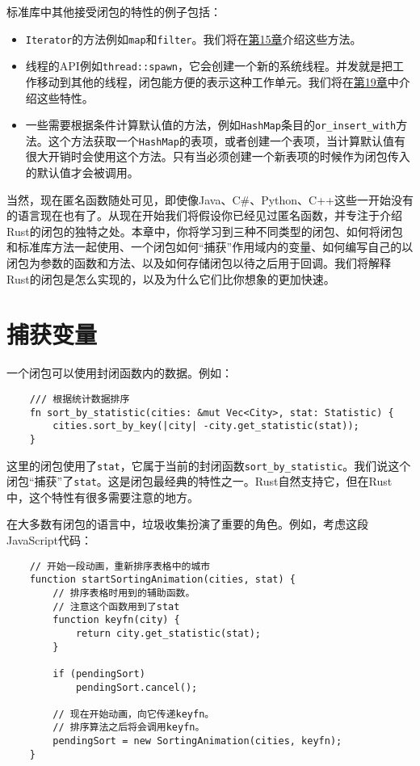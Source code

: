 标准库中其他接受闭包的特性的例子包括：
\begin{itemize}
    \item \texttt{Iterator}的方法例如\texttt{map}和\texttt{filter}。我们将在\hyperref[ch15]{第15章}介绍这些方法。
    \item 线程的API例如\texttt{thread::spawn}，它会创建一个新的系统线程。并发就是把工作移动到其他的线程，闭包能方便的表示这种工作单元。我们将在\hyperref[ch19]{第19章}中介绍这些特性。
    \item 一些需要根据条件计算默认值的方法，例如\texttt{HashMap}条目的\texttt{or\_insert\_with}方法。这个方法获取一个\texttt{HashMap}的表项，或者创建一个表项，当计算默认值有很大开销时会使用这个方法。只有当必须创建一个新表项的时候作为闭包传入的默认值才会被调用。
\end{itemize}

当然，现在匿名函数随处可见，即使像Java、C\#、Python、C++这些一开始没有的语言现在也有了。从现在开始我们将假设你已经见过匿名函数，并专注于介绍Rust的闭包的独特之处。本章中，你将学习到三种不同类型的闭包、如何将闭包和标准库方法一起使用、一个闭包如何“捕获”作用域内的变量、如何编写自己的以闭包为参数的函数和方法、以及如何存储闭包以待之后用于回调。我们将解释Rust的闭包是怎么实现的，以及为什么它们比你想象的更加快速。

\section{捕获变量}
一个闭包可以使用封闭函数内的数据。例如：
\begin{verbatim}
    /// 根据统计数据排序
    fn sort_by_statistic(cities: &mut Vec<City>, stat: Statistic) {
        cities.sort_by_key(|city| -city.get_statistic(stat));
    }
\end{verbatim}

这里的闭包使用了\texttt{stat}，它属于当前的封闭函数\texttt{sort\_by\_statistic}。我们说这个闭包“捕获”了\texttt{stat}。这是闭包最经典的特性之一。Rust自然支持它，但在Rust中，这个特性有很多需要注意的地方。

在大多数有闭包的语言中，垃圾收集扮演了重要的角色。例如，考虑这段JavaScript代码：
\begin{verbatim}
    // 开始一段动画，重新排序表格中的城市
    function startSortingAnimation(cities, stat) {
        // 排序表格时用到的辅助函数。
        // 注意这个函数用到了stat
        function keyfn(city) {
            return city.get_statistic(stat);
        }

        if (pendingSort)
            pendingSort.cancel();

        // 现在开始动画，向它传递keyfn。
        // 排序算法之后将会调用keyfn。
        pendingSort = new SortingAnimation(cities, keyfn);
    }
\end{verbatim}


